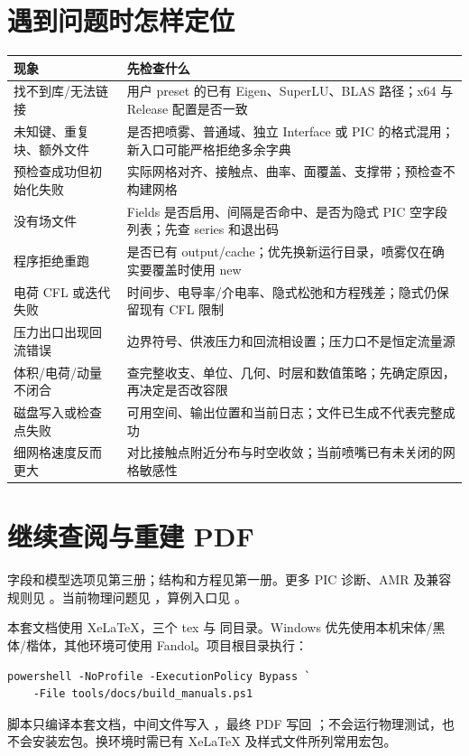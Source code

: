 \documentclass[a4paper,11pt]{article}
\begin{document}
\section{遇到问题时怎样定位}
\begin{longtable}{L{.28\linewidth}L{.64\linewidth}}
\toprule 现象 & 先检查什么 \\\midrule\endhead
找不到库/无法链接 & 用户 preset 的已有 Eigen、SuperLU、BLAS 路径；x64 与 Release 配置是否一致 \\
未知键、重复块、额外文件 & 是否把喷雾、普通域、独立 Interface 或 PIC 的格式混用；新入口可能严格拒绝多余字典 \\
预检查成功但初始化失败 & 实际网格对齐、接触点、曲率、面覆盖、支撑带；预检查不构建网格 \\
没有场文件 & Fields 是否启用、间隔是否命中、是否为隐式 PIC 空字段列表；先查 series 和退出码 \\
程序拒绝重跑 & 是否已有 output/cache；优先换新运行目录，喷雾仅在确实要覆盖时使用 new \\
电荷 CFL 或迭代失败 & 时间步、电导率/介电率、隐式松弛和方程残差；隐式仍保留现有 CFL 限制 \\
压力出口出现回流错误 & 边界符号、供液压力和回流相设置；压力口不是恒定流量源 \\
体积/电荷/动量不闭合 & 查完整收支、单位、几何、时层和数值策略；先确定原因，再决定是否改容限 \\
磁盘写入或检查点失败 & 可用空间、输出位置和当前日志；文件已生成不代表完整成功 \\
细网格速度反而更大 & 对比接触点附近分布与时空收敛；当前喷嘴已有未关闭的网格敏感性 \\
\bottomrule
\end{longtable}

\section{继续查阅与重建 PDF}
字段和模型选项见第三册；结构和方程见第一册。更多 PIC 诊断、AMR 及兼容规则见 。当前物理问题见 ，算例入口见 。

本套文档使用 XeLaTeX，三个 tex 与  同目录。Windows 优先使用本机宋体/黑体/楷体，其他环境可使用 Fandol。项目根目录执行：
\begin{lstlisting}
powershell -NoProfile -ExecutionPolicy Bypass `
    -File tools/docs/build_manuals.ps1
\end{lstlisting}
脚本只编译本套文档，中间文件写入 ，最终 PDF 写回 ；不会运行物理测试，也不会安装宏包。换环境时需已有 XeLaTeX 及样式文件所列常用宏包。
\end{document}
